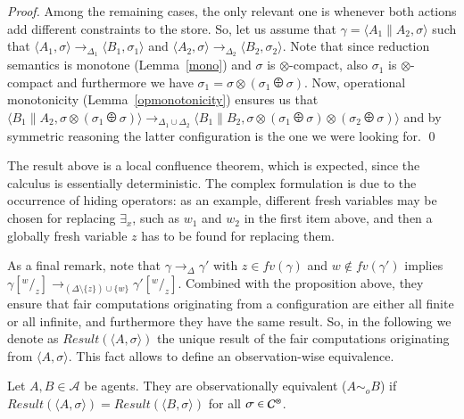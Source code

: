 \documentclass[main.tex]{subfiles}
\begin{document}
\begin{proof}
	Among the remaining cases, the only relevant one is whenever both actions add different constraints to the store.
	So, let us assume that $\gamma = \langle A_1 \parallel A_2, \sigma \rangle$ such that 
	$\langle A_1, \sigma \rangle \rightarrow_{\Delta_1} \langle B_1, \sigma_1 \rangle$
	and
	$\langle A_2, \sigma \rangle \rightarrow_{\Delta_2} \langle B_2, \sigma_2 \rangle$.
	Note that since reduction semantics is monotone (Lemma~\ref{mono})
	and $\sigma$ is $\otimes$-compact, also $\sigma_1$
	is $\otimes$-compact and furthermore we have
	$\sigma_1 = \sigma \otimes (\sigma_1 \odiv \sigma)$.
	Now, operational monotonicity (Lemma~\ref{opmonotonicity}) ensures us that
	$\langle B_1 \parallel A_2, \sigma \otimes (\sigma_1 \odiv \sigma) \rangle
	\rightarrow_{\Delta_1 \cup \Delta_2}
	\langle B_1 \parallel B_2, \sigma \otimes (\sigma_1 \odiv \sigma) \otimes (\sigma_2 \odiv \sigma) \rangle$ 
	and by symmetric reasoning the latter configuration 
	is the one we were looking for. \qed
\end{proof}


The result above is a local confluence theorem, which is expected, since the calculus is essentially deterministic.
The complex formulation is  due to the occurrence of hiding operators: as an example, different fresh variables may be chosen
for replacing $\exists_x$, such as  $w_1$ and $w_2$ in the first item above, and then a globally fresh variable $z$ has to 
be found for replacing them.

As a final remark, note that  $\gamma \rightarrow_\Delta \gamma'$ with $z \in fv(\gamma)$ and $w \not \in fv(\gamma')$
implies $\gamma[^w/_z] \rightarrow_{(\Delta\setminus \{z\}) \cup \{w\}} \gamma'[^w/_z]$.
Combined with the proposition above, they ensure that
%
fair computations originating from a configuration are  either all finite or all infinite, 
and furthermore  they have the same result.
%
So, in the following we denote as $\mathit{Result}(\langle A, \sigma \rangle)$ the unique result of the fair 
computations originating from $\langle A, \sigma \rangle$.
%
This fact allows to define an observation-wise equivalence.

\begin{definition}\label{def:obequivalence}
Let $A, B \in \mathcal {A}$ be agents. They are observationally equivalent ($A \sim_o B$) if 
$\mathit{Result}(\langle A, \sigma \rangle) = \mathit{Result}(\langle B, \sigma \rangle)$
for all $\sigma \in  {\mathcal C}^\otimes$.
\end{definition}
\end{document}
